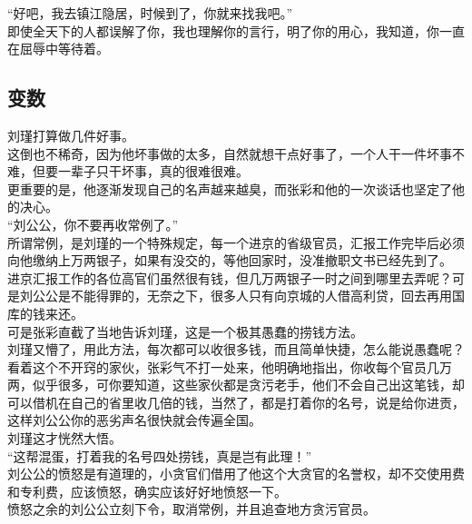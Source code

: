 \begin{multicols}{\theparacolNo}
“好吧，我去镇江隐居，时候到了，你就来找我吧。”\\

即使全天下的人都误解了你，我也理解你的言行，明了你的用心，我知道，你一直在屈辱中等待着。\\

\subsection{变数}
刘瑾打算做几件好事。\\

这倒也不稀奇，因为他坏事做的太多，自然就想干点好事了，一个人干一件坏事不难，但要一辈子只干坏事，真的很难很难。\\

更重要的是，他逐渐发现自己的名声越来越臭，而张彩和他的一次谈话也坚定了他的决心。\\

“刘公公，你不要再收常例了。”\\

所谓常例，是刘瑾的一个特殊规定，每一个进京的省级官员，汇报工作完毕后必须向他缴纳上万两银子，如果有没交的，等他回家时，没准撤职文书已经先到了。\\

进京汇报工作的各位高官们虽然很有钱，但几万两银子一时之间到哪里去弄呢？可是刘公公是不能得罪的，无奈之下，很多人只有向京城的人借高利贷，回去再用国库的钱来还。\\

可是张彩直截了当地告诉刘瑾，这是一个极其愚蠢的捞钱方法。\\

刘瑾又懵了，用此方法，每次都可以收很多钱，而且简单快捷，怎么能说愚蠢呢？\\

看着这个不开窍的家伙，张彩气不打一处来，他明确地指出，你收每个官员几万两，似乎很多，可你要知道，这些家伙都是贪污老手，他们不会自己出这笔钱，却可以借机在自己的省里收几倍的钱，当然了，都是打着你的名号，说是给你进贡，这样刘公公你的恶劣声名很快就会传遍全国。\\

刘瑾这才恍然大悟。\\

“这帮混蛋，打着我的名号四处捞钱，真是岂有此理！”\\

刘公公的愤怒是有道理的，小贪官们借用了他这个大贪官的名誉权，却不交使用费和专利费，应该愤怒，确实应该好好地愤怒一下。\\

愤怒之余的刘公公立刻下令，取消常例，并且追查地方贪污官员。\\


\end{multicols}
